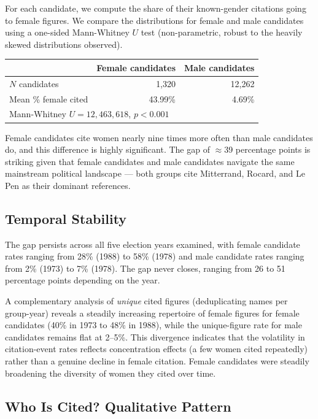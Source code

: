 \documentclass{article}
\begin{document}
For each candidate, we compute the share of their known-gender citations going
to female figures. We compare the distributions for female and male candidates
using a one-sided Mann-Whitney $U$ test (non-parametric, robust to the heavily
skewed distributions observed).

\begin{center}
  \begin{tabular}{lrr}
    \toprule
    & Female candidates & Male candidates \\
    \midrule
    $N$ candidates & 1,320 & 12,262 \\
    Mean \% female cited & 43.99\% & 4.69\% \\
    \midrule
    \multicolumn{3}{l}{Mann-Whitney $U = 12{,}463{,}618$, $p < 0.001$} \\
    \bottomrule
  \end{tabular}
\end{center}

Female candidates cite women nearly nine times more often than male candidates
do, and this difference is highly significant. The gap of $\approx$39 percentage
points is striking given that female candidates and male candidates navigate the
same mainstream political landscape — both groups cite Mitterrand, Rocard, and
Le Pen as their dominant references.

\subsection{Temporal Stability}

The gap persists across all five election years examined, with female candidate
rates ranging from 28\% (1988) to 58\% (1978) and male candidate rates ranging
from 2\% (1973) to 7\% (1978). The gap never closes, ranging from 26 to 51
percentage points depending on the year.

A complementary analysis of \emph{unique} cited figures (deduplicating names
per group-year) reveals a steadily increasing repertoire of female figures for
female candidates (40\% in 1973 to 48\% in 1988), while the unique-figure rate
for male candidates remains flat at 2--5\%. This divergence indicates that the
volatility in citation-event rates reflects concentration effects (a few women
cited repeatedly) rather than a genuine decline in female citation. Female
candidates were steadily broadening the diversity of women they cited over time.

\subsection{Who Is Cited? Qualitative Pattern}
\end{document}
